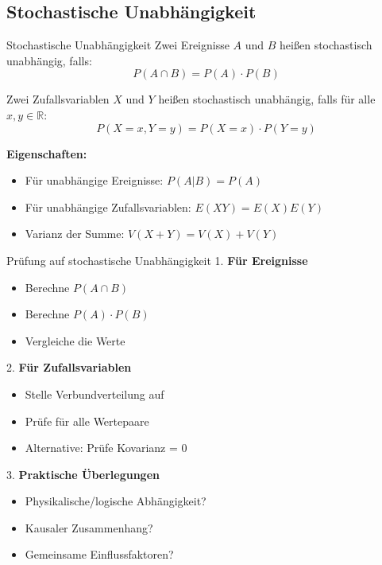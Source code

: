 \subsection{Stochastische Unabhängigkeit}

\begin{definition}{Stochastische Unabhängigkeit}
Zwei Ereignisse $A$ und $B$ heißen stochastisch unabhängig, falls:
$$P(A \cap B) = P(A) \cdot P(B)$$

Zwei Zufallsvariablen $X$ und $Y$ heißen stochastisch unabhängig, falls für alle $x,y \in \mathbb{R}$:
$$P(X=x, Y=y) = P(X=x) \cdot P(Y=y)$$

\textbf{Eigenschaften:}
\begin{itemize}
    \item Für unabhängige Ereignisse: $P(A|B) = P(A)$
    \item Für unabhängige Zufallsvariablen: $E(XY) = E(X)E(Y)$
    \item Varianz der Summe: $V(X+Y) = V(X) + V(Y)$
\end{itemize}
\end{definition}

\begin{KR}{Prüfung auf stochastische Unabhängigkeit}
1. \textbf{Für Ereignisse}
   \begin{itemize}
   \item Berechne $P(A \cap B)$
   \item Berechne $P(A) \cdot P(B)$
   \item Vergleiche die Werte
   \end{itemize}

2. \textbf{Für Zufallsvariablen}
   \begin{itemize}
   \item Stelle Verbundverteilung auf
   \item Prüfe für alle Wertepaare
   \item Alternative: Prüfe Kovarianz = 0
   \end{itemize}

3. \textbf{Praktische Überlegungen}
   \begin{itemize}
   \item Physikalische/logische Abhängigkeit?
   \item Kausaler Zusammenhang?
   \item Gemeinsame Einflussfaktoren?
   \end{itemize}
\end{KR}


